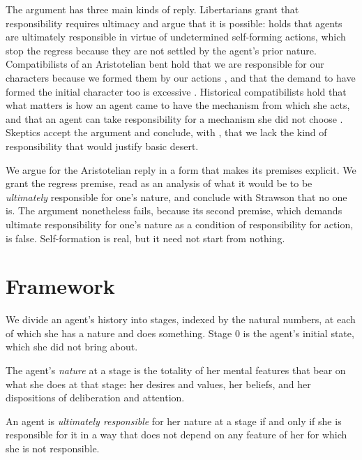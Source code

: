 \documentclass{situationist-preprint}
\begin{document}
The argument has three main kinds of reply. Libertarians grant that responsibility requires ultimacy and argue that it is possible: \citet{Kane1996} holds that agents are ultimately responsible in virtue of undetermined self-forming actions, which stop the regress because they are not settled by the agent's prior nature. Compatibilists of an Aristotelian bent hold that we are responsible for our characters because we formed them by our actions \citep[III.5]{AristotleNE}, and that the demand to have formed the initial character too is excessive \citep{Dennett1984}. Historical compatibilists hold that what matters is how an agent came to have the mechanism from which she acts, and that an agent can take responsibility for a mechanism she did not choose \citep{FischerRavizza1998}. Skeptics accept the argument and conclude, with \citet{Pereboom2001}, that we lack the kind of responsibility that would justify basic desert.

We argue for the Aristotelian reply in a form that makes its premises explicit. We grant the regress premise, read as an analysis of what it would be to be \emph{ultimately} responsible for one's nature, and conclude with Strawson that no one is. The argument nonetheless fails, because its second premise, which demands ultimate responsibility for one's nature as a condition of responsibility for action, is false. Self-formation is real, but it need not start from nothing.

\section{Framework}\label{s:frame}

We divide an agent's history into stages, indexed by the natural numbers, at each of which she has a nature and does something. Stage $0$ is the agent's initial state, which she did not bring about.

\begin{definition}\label{d:nature}
The agent's \emph{nature} at a stage is the totality of her mental features that bear on what she does at that stage: her desires and values, her beliefs, and her dispositions of deliberation and attention.
\end{definition}

\begin{definition}\label{d:ult}
An agent is \emph{ultimately responsible} for her nature at a stage if and only if she is responsible for it in a way that does not depend on any feature of her for which she is not responsible.
\end{definition}
\end{document}
